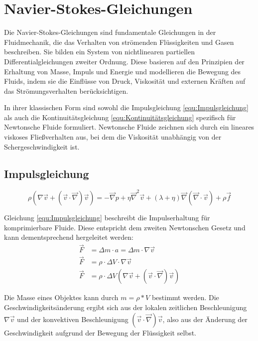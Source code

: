 \documentclass[a4paper, 12pt]{article}
\begin{document}
\section{Navier-Stokes-Gleichungen} \label{Kap:NavierStrokes}
Die Navier-Stokes-Gleichungen sind fundamentale Gleichungen in der Fluidmechanik, die das Verhalten von strömenden Flüssigkeiten und Gasen beschreiben. Sie bilden ein System von nichtlinearen partiellen Differentialgleichungen zweiter Ordnung. Diese basieren auf den Prinzipien der Erhaltung von Masse, Impuls und Energie und modellieren die Bewegung des Fluids, indem sie die Einflüsse von Druck, Viskosität und externen Kräften auf das Strömungsverhalten berücksichtigen.

In ihrer klassischen Form sind sowohl die Impulsgleichung \eqref{equ:Impulsgleichung} als auch die Kontinuitätsgleichung \eqref{equ:Kontinuitätsgleichung} spezifisch für Newtonsche Fluide formuliert. Newtonsche Fluide zeichnen sich durch ein lineares viskoses Fließverhalten aus, bei dem die Viskosität unabhängig von der Schergeschwindigkeit ist.


\subsection{Impulsgleichung}
\begin{equation} \label{equ:Impulsgleichung}
	\rho(\nabla \vec{v} + (\vec{v} \cdot \vec{\nabla})\vec{v}) = - \vec{\nabla}p + \eta \vec{\nabla}^2 \vec{v} + (\lambda + \eta)\vec{\nabla}(\vec{\nabla} \cdot \vec{v}) + \rho \vec{f}
\end{equation}

Gleichung \eqref{equ:Impulsgleichung} beschreibt die Impulserhaltung für komprimierbare Fluide. Diese entspricht dem zweiten Newtonschen Gesetz und kann dementsprechend hergeleitet werden:
\begin{align}
	\vec{F} & =\Delta m \cdot a = \Delta m \cdot \nabla \vec{v} \nonumber                 \\
	\vec{F} & =\rho \cdot \Delta V \cdot \nabla \vec{v} \nonumber                         \\
	\vec{F} & =\rho \cdot \Delta V (\nabla \vec{v} + (\vec{v} \cdot \vec{\nabla})\vec{v})
	\label{equ:Newtonsches_Gesetz}
\end{align}

Die Masse eines Objektes kann durch $m = \rho * V$ bestimmt werden. Die Geschwindigkeitsänderung ergibt sich aus der lokalen zeitlichen Beschleunigung $\nabla \vec{v}$ und der konvektiven Beschleunigung $(\vec{v} \cdot \vec{\nabla})\vec{v}$, also aus der Änderung der Geschwindigkeit aufgrund der Bewegung der Flüssigkeit selbst.
\end{document}

